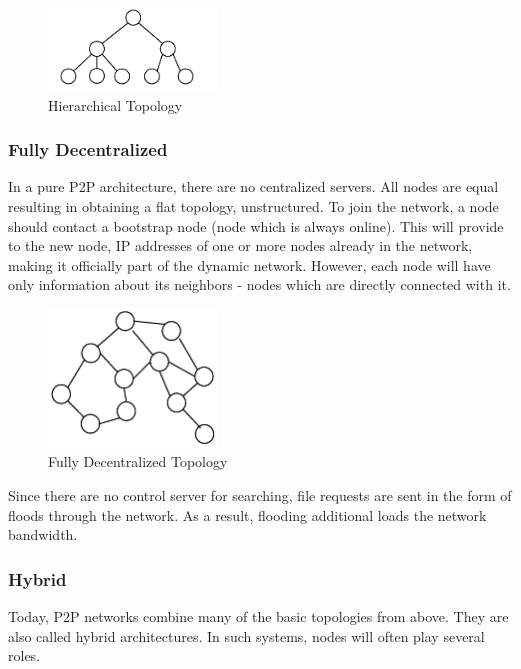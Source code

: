 \begin{figure}
  \centering
  \includegraphics[width=0.4\textwidth]{src/img/p2p-systems/hierarchical}
  \caption{Hierarchical Topology}
  \label{fig:p2p-systems:hierarchical}
\end{figure}

\subsubsection{Fully Decentralized}

In a pure P2P architecture, there are no centralized servers. All nodes are
equal resulting in obtaining a flat topology, unstructured. To join the network,
a node should contact a bootstrap node (node which is always online). This will
provide to the new node, IP addresses of one or more nodes already in the
network, making it officially part of the dynamic network. However, each node
will have only information about its neighbors - nodes which are directly
connected with it.

\begin{figure}
  \centering
  \includegraphics[width=0.4\textwidth]{src/img/p2p-systems/decentralized}
  \caption{Fully Decentralized Topology}
  \label{fig:p2p-systems:decentralized}
\end{figure}

Since there are no control server for searching, file requests are sent in the
form of floods through the network. As a result, flooding additional loads the
network bandwidth.

\subsubsection{Hybrid}

Today, P2P networks combine many of the basic topologies from above. They are
also called hybrid architectures. In such systems, nodes will often play several
roles.


